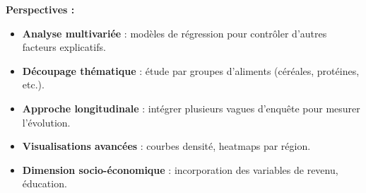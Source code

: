 \documentclass[
]{article}
\providecommand{\tightlist}{%
  \setlength{\itemsep}{0pt}\setlength{\parskip}{0pt}}
\begin{document}
\textbf{Perspectives :}

\begin{itemize}
\tightlist
\item
  \textbf{Analyse multivariée} : modèles de régression pour contrôler
  d'autres facteurs explicatifs.
\item
  \textbf{Découpage thématique} : étude par groupes d'aliments
  (céréales, protéines, etc.).
\item
  \textbf{Approche longitudinale} : intégrer plusieurs vagues d'enquête
  pour mesurer l'évolution.
\item
  \textbf{Visualisations avancées} : courbes densité, heatmaps par
  région.
\item
  \textbf{Dimension socio-économique} : incorporation des variables de
  revenu, éducation.
\end{itemize}
\end{document}
